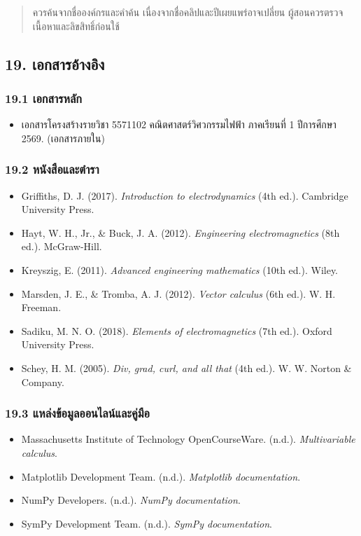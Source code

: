 \begin{quote}
ควรค้นจากชื่อองค์กรและคำค้น เนื่องจากชื่อคลิปและปีเผยแพร่อาจเปลี่ยน ผู้สอนควรตรวจเนื้อหาและลิขสิทธิ์ก่อนใช้
\end{quote}

\subsection{19. เอกสารอ้างอิง}

\subsubsection{19.1 เอกสารหลัก}

\begin{itemize}
\item เอกสารโครงสร้างรายวิชา 5571102 คณิตศาสตร์วิศวกรรมไฟฟ้า ภาคเรียนที่ 1 ปีการศึกษา 2569. (เอกสารภายใน)
\end{itemize}

\subsubsection{19.2 หนังสือและตำรา}

\begin{itemize}
\item Griffiths, D. J. (2017). \emph{Introduction to electrodynamics} (4th ed.). Cambridge University Press.
\item Hayt, W. H., Jr., \& Buck, J. A. (2012). \emph{Engineering electromagnetics} (8th ed.). McGraw-Hill.
\item Kreyszig, E. (2011). \emph{Advanced engineering mathematics} (10th ed.). Wiley.
\item Marsden, J. E., \& Tromba, A. J. (2012). \emph{Vector calculus} (6th ed.). W. H. Freeman.
\item Sadiku, M. N. O. (2018). \emph{Elements of electromagnetics} (7th ed.). Oxford University Press.
\item Schey, H. M. (2005). \emph{Div, grad, curl, and all that} (4th ed.). W. W. Norton \& Company.
\end{itemize}

\subsubsection{19.3 แหล่งข้อมูลออนไลน์และคู่มือ}

\begin{itemize}
\item Massachusetts Institute of Technology OpenCourseWare. (n.d.). \emph{Multivariable calculus}.
\item Matplotlib Development Team. (n.d.). \emph{Matplotlib documentation}.
\item NumPy Developers. (n.d.). \emph{NumPy documentation}.
\item SymPy Development Team. (n.d.). \emph{SymPy documentation}.
\end{itemize}

